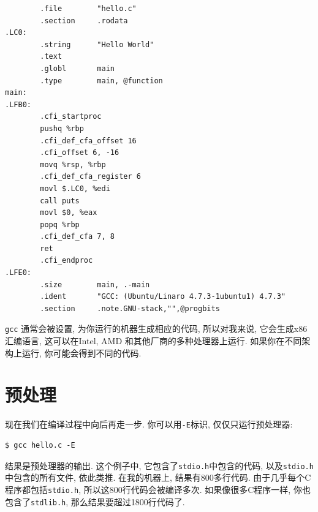 \documentclass[12pt]{book}
\begin{document}
{\begin{verbatim}
        .file        "hello.c"
        .section     .rodata
.LC0:
        .string      "Hello World"
        .text
        .globl       main
        .type        main, @function
main:
.LFB0:
        .cfi_startproc
        pushq %rbp
        .cfi_def_cfa_offset 16
        .cfi_offset 6, -16
        movq %rsp, %rbp
        .cfi_def_cfa_register 6
        movl $.LC0, %edi
        call puts
        movl $0, %eax
        popq %rbp
        .cfi_def_cfa 7, 8
        ret
        .cfi_endproc
.LFE0:
        .size        main, .-main
        .ident       "GCC: (Ubuntu/Linaro 4.7.3-1ubuntu1) 4.7.3"
        .section     .note.GNU-stack,"",@progbits
\end{verbatim}

{\tt gcc} 通常会被设置, 为你运行的机器生成相应的代码,
所以对我来说, 它会生成x86汇编语言,
这可以在Intel, AMD 和其他厂商的多种处理器上运行.
如果你在不同架构上运行, 你可能会得到不同的代码.

\section{预处理}
现在我们在编译过程中向后再走一步.
你可以用{\tt -E}标识, 仅仅只运行预处理器:

\begin{verbatim}
$ gcc hello.c -E
\end{verbatim}
结果是预处理器的输出.
这个例子中, 它包含了{\tt stdio.h}中包含的代码, 
以及{\tt stdio.h}中包含的所有文件, 依此类推.
在我的机器上, 结果有800多行代码.
由于几乎每个C程序都包括{\tt stdio.h}, 所以这800行代码会被编译多次.
如果像很多C程序一样, 你也包含了{\tt stdlib.h},
那么结果要超过1800行代码了.

}
\end{document}
